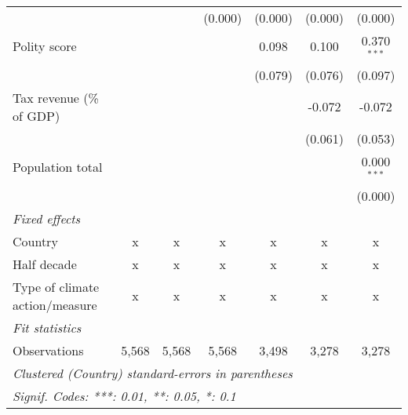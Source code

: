 \begin{tabular}{lcccccc}
                                                                              &               &               & (0.000)       & (0.000)       & (0.000)       & (0.000)\\   
   Polity score                                                               &               &               &               & 0.098         & 0.100         & 0.370$^{***}$\\   
                                                                              &               &               &               & (0.079)       & (0.076)       & (0.097)\\   
   Tax revenue (\% of GDP)                                                    &               &               &               &               & -0.072        & -0.072\\   
                                                                              &               &               &               &               & (0.061)       & (0.053)\\   
   Population total                                                           &               &               &               &               &               & 0.000$^{***}$\\   
                                                                              &               &               &               &               &               & (0.000)\\   
   \emph{Fixed effects}\\
   Country                                                                    & x             & x             & x             & x             & x             & x\\  
   Half decade                                                                & x             & x             & x             & x             & x             & x\\  
   Type of climate action/measure                                             & x             & x             & x             & x             & x             & x\\  
   \midrule \emph{Fit statistics}\\
   Observations                                                               & 5,568         & 5,568         & 5,568         & 3,498         & 3,278         & 3,278\\  
   \midrule
   \multicolumn{7}{l}{\emph{Clustered (Country) standard-errors in parentheses}}\\
   \multicolumn{7}{l}{\emph{Signif. Codes: ***: 0.01, **: 0.05, *: 0.1}}\\
\end{tabular}
\par\endgroup


